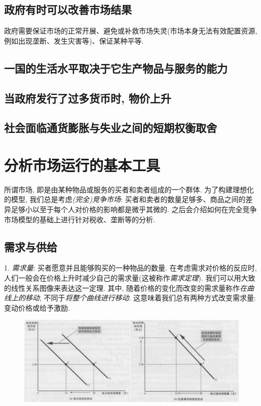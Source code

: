 \subsection*{政府有时可以改善市场结果}

政府需要保证市场的正常开展、避免或补救市场失灵(市场本身无法有效配置资源, 例如出现垄断、发生灾害等)、保证某种平等. 

\subsection*{一国的生活水平取决于它生产物品与服务的能力}

\subsection*{当政府发行了过多货币时, 物价上升}

\subsection*{社会面临通货膨胀与失业之间的短期权衡取舍}

\newpage
\section{分析市场运行的基本工具}

所谓市场, 即是由某种物品或服务的买者和卖者组成的一个群体. 为了构建理想化的模型, 我们总是考虑\textit{(完全)竞争市场}: 买者和卖者的数量足够多、商品之间的差异足够小以至于每个人对价格的影响都是微乎其微的. 之后会介绍如何在完全竞争市场模型的基础上进行针对税收、垄断等的分析. 

\subsection{需求与供给}

1. \textit{需求量}: 买者愿意并且能够购买的一种物品的数量. 在考虑需求对价格的反应时, 人们一般会在价格上升时减少自己的需求量(这被称作\textit{需求定理}). 我们可以用大致的线性关系图像来表达这一定理. 其中, 随着价格的变化而改变的需求量称作\textit{在曲线上的移动}, 不同于\textit{将整个曲线进行移动}. 这意味着我们总有两种方式改变需求量: 变动价格或给予激励. 

\begin{figure}[H]
	\centering
	\includegraphics[width=18cm]{attachment/Fig4_2.png}
\end{figure}

